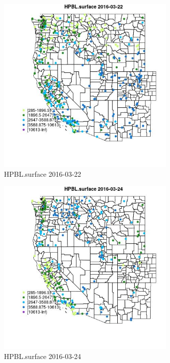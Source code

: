 \begin{figure} 
\centering  
\includegraphics[width=0.77\textwidth]{Code_Outputs/Report_ML_input_PM25_Step4_part_e_de_duplicated_aveswNAs_MapObsHPBLsurface2016-03-22.jpg} 
\caption{\label{fig:Report_ML_input_PM25_Step4_part_e_de_duplicated_aveswNAsMapObsHPBLsurface2016-03-22}HPBL.surface 2016-03-22} 
\end{figure} 
 

\begin{figure} 
\centering  
\includegraphics[width=0.77\textwidth]{Code_Outputs/Report_ML_input_PM25_Step4_part_e_de_duplicated_aveswNAs_MapObsHPBLsurface2016-03-24.jpg} 
\caption{\label{fig:Report_ML_input_PM25_Step4_part_e_de_duplicated_aveswNAsMapObsHPBLsurface2016-03-24}HPBL.surface 2016-03-24} 
\end{figure} 
 

